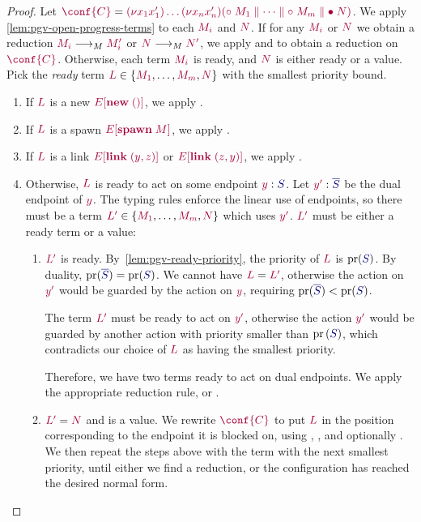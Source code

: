 \begin{proof}
  \label{prf:thm-pgv-closed-progress-confs}
  Let $\tm{\conf{C}}=\tm{\res{x_1}{x'_1}{\dots\res{x_n}{x'_n}{(\child\;M_1\parallel\dots\parallel\child\;M_m\parallel\main\;N)}}}$.
  We apply \cref{lem:pgv-open-progress-terms} to each $\tm{M_i}$ and $\tm{N}$. If for any $\tm{M_i}$ or $\tm{N}$ we obtain a reduction $\tm{M_i}\tred\tm{M'_i}$ or $\tm{N}\tred\tm{N'}$, we apply  and  to obtain a reduction on $\tm{\conf{C}}$.
  Otherwise, each term $\tm{M_i}$ is ready, and $\tm{N}$ is either ready or a value.
  Pick the \emph{ready} term $\tm{L}\in\{\tm{M_1},\dots,\tm{M_m},\tm{N}\}$ with the smallest priority bound.
  \begin{enumerate}
  \item
    If $\tm{L}$ is a new $\tm{\plug{E}{\new\;\unit}}$, we apply .
  \item
    If $\tm{L}$ is a spawn $\tm{\plug{E}{\spawn\;M}}$, we apply .
  \item
    If $\tm{L}$ is a link $\tm{\plug{E}{\link\;\pair{y}{z}}}$ or $\tm{\plug{E}{\link\;\pair{z}{y}}}$, we apply .
  \item
    Otherwise, $\tm{L}$ is ready to act on some endpoint $\tmty{y}{S}$. Let $\tmty{y'}{\co{S}}$ be the dual endpoint of $\tm{y}$. The typing rules enforce the linear use of endpoints, so there must be a term $\tm{L'}\in\{\tm{M_1},\dots,\tm{M_m},\tm{N}\}$ which uses $\tm{y'}$. $\tm{L'}$ must be either a ready term or a value:
    \begin{enumerate}
    \item
      $\tm{L'}$ is ready. By~\cref{lem:pgv-ready-priority}, the priority of $\tm{L}$ is $\pr(\ty{S})$. By duality, $\pr(\ty{\co{S}})=\pr(\ty{S})$.
      We cannot have $\tm{L}=\tm{L'}$, otherwise the action on $\tm{y'}$ would be guarded by the action on $\tm{y}$, requiring $\pr(\ty{\co{S}})<\pr(\ty{S})$.

      The term $\tm{L'}$ must be ready to act on $\tm{y'}$, otherwise the action $\tm{y'}$ would be guarded by another action with priority smaller than $\pr{(\ty{S})}$, which contradicts our choice of $\tm{L}$ as having the smallest priority.

      Therefore, we have two terms ready to act on dual endpoints. We apply the appropriate reduction rule, \ie {} or .
    \item
      $\tm{L'}=\tm{N}$ and is a value. We rewrite $\tm{\conf{C}}$ to put $\tm{L}$ in the position corresponding to the endpoint it is blocked on, using , , and optionally .
      We then repeat the steps above with the term with the next smallest priority, until either we find a reduction, or the configuration has reached the desired normal form.


\end{enumerate}
\end{enumerate}
\end{proof}
